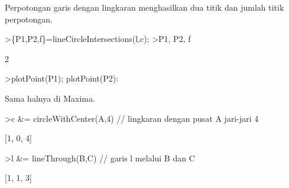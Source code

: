\documentclass[a4paper,10pt]{article}
\begin{document}
\begin{eulernotebook}
\begin{eulercomment}
\begin{eulercomment}
\begin{eulercomment}
\begin{eulercomment}
\begin{eulercomment}
\begin{eulercomment}
\begin{eulercomment}
\begin{eulercomment}
\begin{eulercomment}
\begin{eulercomment}
\begin{eulercomment}
\begin{eulercomment}
\begin{eulercomment}
\begin{eulercomment}
\begin{eulercomment}
\begin{eulercomment}
\begin{eulercomment}
\begin{eulercomment}
\begin{eulercomment}
\begin{eulercomment}
\begin{eulercomment}
\begin{eulercomment}
\begin{eulercomment}
\begin{eulercomment}
\begin{eulercomment}
\begin{eulercomment}
\begin{eulercomment}
\begin{eulercomment}
\begin{eulercomment}
\begin{eulercomment}
\begin{eulercomment}
Perpotongan garis dengan lingkaran menghasilkan dua titik dan jumlah
titik perpotongan.
\end{eulercomment}
\begin{eulerprompt}
>\{P1,P2,f\}=lineCircleIntersections(l,c);
>P1, P2, f
\end{eulerprompt}
\begin{euleroutput}
  [4.64575,  -1.64575]
  [-0.645751,  3.64575]
  2
\end{euleroutput}
\begin{eulerprompt}
>plotPoint(P1); plotPoint(P2):
\end{eulerprompt}
\begin{eulercomment}
Sama halnya di Maxima.
\end{eulercomment}
\begin{eulerprompt}
>c &= circleWithCenter(A,4) // lingkaran dengan pusat A jari-jari 4
\end{eulerprompt}
\begin{euleroutput}
  
                                [1, 0, 4]
  
\end{euleroutput}
\begin{eulerprompt}
>l &= lineThrough(B,C) // garis l melalui B dan C
\end{eulerprompt}
\begin{euleroutput}
  
                                [1, 1, 3]
  

\end{euleroutput}
\end{eulercomment}
\end{eulercomment}
\end{eulercomment}
\end{eulercomment}
\end{eulercomment}
\end{eulercomment}
\end{eulercomment}
\end{eulercomment}
\end{eulercomment}
\end{eulercomment}
\end{eulercomment}
\end{eulercomment}
\end{eulercomment}
\end{eulercomment}
\end{eulercomment}
\end{eulercomment}
\end{eulercomment}
\end{eulercomment}
\end{eulercomment}
\end{eulercomment}
\end{eulercomment}
\end{eulercomment}
\end{eulercomment}
\end{eulercomment}
\end{eulercomment}
\end{eulercomment}
\end{eulercomment}
\end{eulercomment}
\end{eulercomment}
\end{eulercomment}
\end{eulernotebook}
\end{document}
